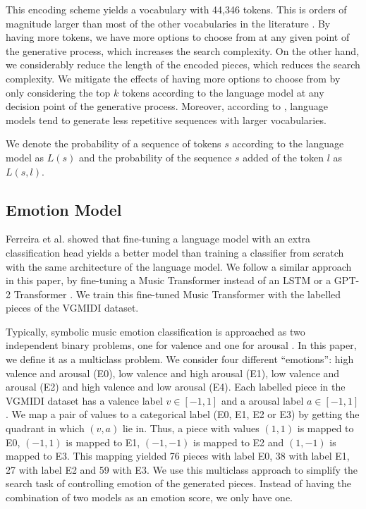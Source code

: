 This encoding scheme yields a vocabulary with 44,346 tokens. This is
orders of magnitude larger than most of the other vocabularies in the literature \cite{briot2017deep}. By having more tokens, we have more options to choose from at any given point of the generative process, which increases the search complexity. On the other hand, we considerably reduce the length of the encoded pieces, which reduces the search complexity. We mitigate the effects of having more options to choose from by only considering the top $k$ tokens according to the language model at any decision point of the generative process.
%
Moreover,
according to \cite{holtzman2018learning}, language models tend to generate less
repetitive sequences with larger vocabularies.

We denote the probability of a sequence of tokens $s$ according to the language model as $L(s)$ and the probability of the sequence $s$ added of the token $l$ as $L(s, l)$.

\subsection{Emotion Model}\label{sec:emotion_classifier}

Ferreira et al. \cite{ferreira_2019, ferreira2020computer} showed that
fine-tuning a language model with an extra classification head yields a
better model than training a classifier from scratch with the
same architecture of the language model. We follow a similar approach
in this paper, by fine-tuning a Music Transformer instead of
an LSTM \cite{ferreira_2019} or a GPT-2 Transformer \cite{ferreira2020computer}.
We train this fine-tuned Music Transformer with the labelled pieces
of the VGMIDI dataset.

Typically, symbolic music emotion classification is approached as two
independent binary problems, one for valence and one for arousal \cite{ferreira_2019, ferreira2020computer}. In this paper, we define
it as a multiclass problem. We consider four different ``emotions'':
high valence and arousal (E0), low valence and high arousal (E1),
low valence and arousal (E2) and high valence and low arousal (E4).
Each labelled piece in the VGMIDI dataset has a valence label $v \in [-1, 1]$ and a arousal label $a \in [-1, 1]$. We map a pair of values to a categorical label (E0, E1, E2 or E3) by getting the quadrant in which $(v,a)$ lie in. Thus, a piece with values $(1,1)$ is mapped
to E0, $(-1,1)$ is mapped to E1, $(-1,-1)$ is mapped to E2
and $(1, -1)$ is mapped to E3. This mapping yielded 76 pieces with label E0, 38 with label E1, 27 with label E2 and 59 with E3.
We use this multiclass approach to simplify the search task of controlling emotion of the generated pieces. Instead of having
the combination of two models as an emotion score, we only have one.

